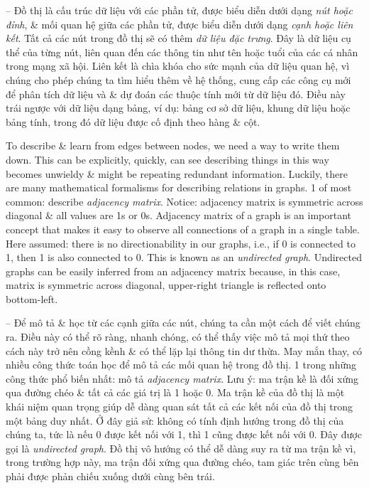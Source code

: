 \documentclass{article}
\begin{document}
\begin{itemize}
\begin{itemize}
\begin{itemize}
            -- Đồ thị là cấu trúc dữ liệu với các phần tử, được biểu diễn dưới dạng {\it nút hoặc đỉnh}, \& mối quan hệ giữa các phần tử, được biểu diễn dưới dạng {\it cạnh hoặc liên kết}. Tất cả các nút trong đồ thị sẽ có thêm {\it dữ liệu đặc trưng}. Đây là dữ liệu cụ thể của từng nút, liên quan đến các thông tin như tên hoặc tuổi của các cá nhân trong mạng xã hội. Liên kết là chìa khóa cho sức mạnh của dữ liệu quan hệ, vì chúng cho phép chúng ta tìm hiểu thêm về hệ thống, cung cấp các công cụ mới để phân tích dữ liệu và \& dự đoán các thuộc tính mới từ dữ liệu đó. Điều này trái ngược với dữ liệu dạng bảng, ví dụ: bảng cơ sở dữ liệu, khung dữ liệu hoặc bảng tính, trong đó dữ liệu được cố định theo hàng \& cột.

            To describe \& learn from edges between nodes, we need a way to write them down. This can be explicitly, quickly, can see describing things in this way becomes unwieldy \& might be repeating redundant information. Luckily, there are many mathematical formalisms for describing relations in graphs. 1 of most common: describe {\it adjacency matrix}. Notice: adjacency matrix is symmetric across diagonal \& all values are 1s or 0s. Adjacency matrix of a graph is an important concept that makes it easy to observe all connections of a graph in a single table. Here assumed: there is no directionability in our graphs, i.e., if 0 is connected to 1, then 1 is also connected to 0. This is known as an {\it undirected graph}. Undirected graphs can be easily inferred from an adjacency matrix because, in this case, matrix is symmetric across diagonal, upper-right triangle is reflected onto bottom-left.

            -- Để mô tả \& học từ các cạnh giữa các nút, chúng ta cần một cách để viết chúng ra. Điều này có thể rõ ràng, nhanh chóng, có thể thấy việc mô tả mọi thứ theo cách này trở nên cồng kềnh \& có thể lặp lại thông tin dư thừa. May mắn thay, có nhiều công thức toán học để mô tả các mối quan hệ trong đồ thị. 1 trong những công thức phổ biến nhất: mô tả {\it adjacency matrix}. Lưu ý: ma trận kề là đối xứng qua đường chéo \& tất cả các giá trị là 1 hoặc 0. Ma trận kề của đồ thị là một khái niệm quan trọng giúp dễ dàng quan sát tất cả các kết nối của đồ thị trong một bảng duy nhất. Ở đây giả sử: không có tính định hướng trong đồ thị của chúng ta, tức là nếu 0 được kết nối với 1, thì 1 cũng được kết nối với 0. Đây được gọi là {\it undirected graph}. Đồ thị vô hướng có thể dễ dàng suy ra từ ma trận kề vì, trong trường hợp này, ma trận đối xứng qua đường chéo, tam giác trên cùng bên phải được phản chiếu xuống dưới cùng bên trái.


\end{itemize}
\end{itemize}
\end{itemize}
\end{document}
